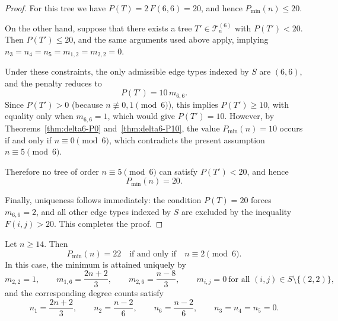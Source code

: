 \documentclass[preprint,12pt]{elsarticle}
\begin{document}
\begin{proof}
For this tree we have $P(T)=2\,F(6,6)=20$,
and hence $P_{\min}(n)\le 20$.

On the other hand, suppose that there exists a tree $T'\in\mathcal{T}_n^{(6)}$
with $P(T')<20$.
Then $P(T')\le 20$, and the same arguments used above apply,
implying $n_3=n_4=n_5=m_{1,2}=m_{2,2}=0$.

Under these constraints, the only admissible edge types indexed by $S$ are
$(6,6)$, and the penalty reduces to
\[
P(T')=10\,m_{6,6}.
\]
Since $P(T')>0$ (because $n\not\equiv 0,1\pmod 6$), this implies
$P(T')\ge 10$, with equality only when $m_{6,6}=1$, which would give
$P(T')=10$.
However, by Theorems~\ref{thm:delta6-P0} and~\ref{thm:delta6-P10}, the value
$P_{\min}(n)=10$ occurs if and only if $n\equiv 0\pmod 6$, which contradicts
the present assumption $n\equiv 5\pmod 6$.

Therefore no tree of order $n\equiv 5\pmod 6$ can satisfy $P(T')<20$, and hence
\[
P_{\min}(n)=20.
\]


Finally, uniqueness follows immediately: the condition $P(T)=20$ forces
$m_{6,6}=2$, and all other edge types indexed by $S$ are excluded by the
inequality $F(i,j)>20$.
This completes the proof.
\end{proof}


\begin{theorem}
\label{thm:delta6-P22}
Let $n\ge 14$. Then
\[
P_{\min}(n)=22
\quad\text{if and only if}\quad
n\equiv 2 \pmod 6.
\]
In this case, the minimum is attained uniquely by
\[
m_{2,2}=1,\qquad
m_{1,6}=\frac{2n+2}{3},\qquad
m_{2,6}=\frac{n-8}{3},
\qquad
m_{i,j}=0\ \text{for all }(i,j)\in S\setminus\{(2,2)\},
\]
and the corresponding degree counts satisfy
\[
n_1=\frac{2n+2}{3},\qquad
n_2=\frac{n-2}{6},\qquad
n_6=\frac{n-2}{6},\qquad
n_3=n_4=n_5=0.
\]
\end{theorem}
\end{document}
